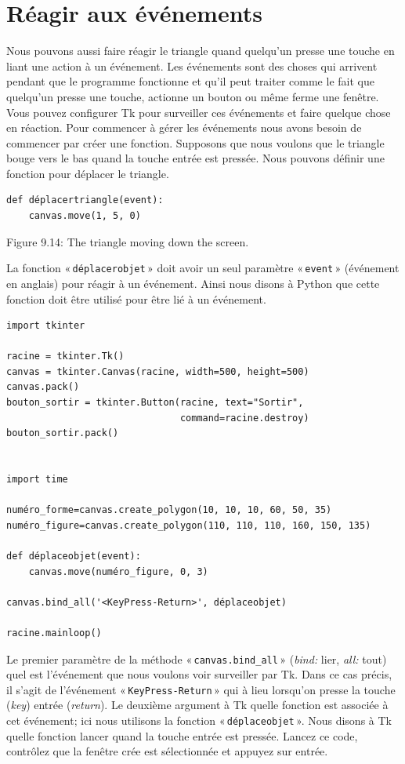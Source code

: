 \section{Réagir aux événements}
Nous pouvons aussi faire réagir le triangle quand quelqu'un presse une touche en liant une action à un événement. Les événements sont des choses qui arrivent pendant que le programme fonctionne et qu'il peut traiter comme le fait que quelqu'un presse une touche, actionne un bouton ou même ferme une fenêtre. Vous pouvez configurer Tk pour surveiller ces événements et faire quelque chose en réaction. Pour commencer à gérer les événements nous avons besoin de commencer par créer une fonction. Supposons que nous voulons que le triangle bouge vers le bas quand la touche entrée est pressée. Nous pouvons définir une fonction pour déplacer le triangle.
\begin{Verbatim}[frame=single,rulecolor=\color{gray}, label=ne pas taper]
def déplacertriangle(event):
    canvas.move(1, 5, 0)
\end{Verbatim}


Figure 9.14: The triangle moving down the screen.


La fonction « \texttt{déplacerobjet} » doit avoir un seul paramètre « \texttt{event} » (événement en anglais) pour réagir à un événement. Ainsi nous disons à Python que cette fonction doit être utilisé pour être lié à un événement.


\begin{Verbatim}[frame=single,rulecolor=\color{mbleu}, label=à taper]
import tkinter

racine = tkinter.Tk()
canvas = tkinter.Canvas(racine, width=500, height=500)
canvas.pack()
bouton_sortir = tkinter.Button(racine, text="Sortir",
                               command=racine.destroy)
bouton_sortir.pack()


import time

numéro_forme=canvas.create_polygon(10, 10, 10, 60, 50, 35)
numéro_figure=canvas.create_polygon(110, 110, 110, 160, 150, 135)

def déplaceobjet(event):
    canvas.move(numéro_figure, 0, 3)

canvas.bind_all('<KeyPress-Return>', déplaceobjet)

racine.mainloop()
\end{Verbatim}

Le premier paramètre de la méthode « \texttt{canvas.bind\_all} » (\emph{bind:} lier, \emph{all:} tout) quel est l'événement que nous voulons voir surveiller par Tk. Dans ce cas précis, il s'agit de l'événement « \texttt{KeyPress-Return} » qui à lieu lorsqu'on presse la touche (\emph{key}) entrée (\emph{return}). Le deuxième argument à Tk quelle fonction est associée à cet événement; ici nous utilisons la fonction  « \texttt{déplaceobjet} ». Nous disons à Tk quelle fonction lancer quand la touche entrée est pressée. Lancez ce code, contrôlez que la fenêtre crée est sélectionnée et appuyez sur entrée.

